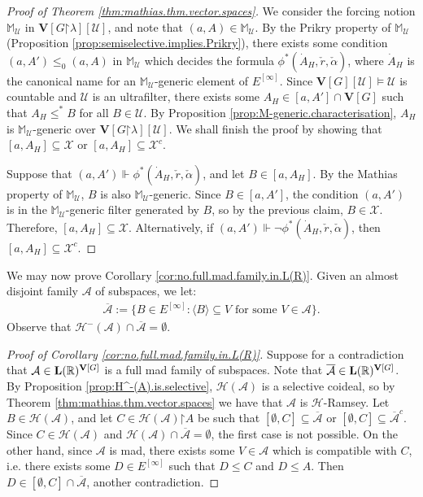 \documentclass[10pt,a4paper]{amsart}
\theoremstyle{plain}
\numberwithin{equation}{section}
\theoremstyle{definition}
\renewcommand{\c}[1]{\langle #1 \rangle}
\newcommand{\R}{\mathbb{R}}
\renewcommand{\bar}[1]{\overline{#1}}
\newcommand{\cal}{\mathcal}
\renewcommand{\bf}{\mathbf}
\newcommand{\A}{\cal{A}}
\newcommand{\forces}{\Vdash}
\newcommand{\restrictedto}{\mathord{\upharpoonright}}
\newcommand{\U}{\cal{U}}
\newcommand{\V}{\bf{V}}
\newcommand{\X}{\cal{X}}
\renewcommand{\H}{\cal{H}}
\let\strokeL\L
\DeclareRobustCommand{\L}{\ifmmode\mathbf{L}\else\strokeL\fi}
\begin{document}
\begin{proof}[Proof of Theorem \ref{thm:mathias.thm.vector.spaces}]
    We consider the forcing notion $\mathbb{M}_\U$ in $\V[G\restrictedto\lambda][\U]$, and note that $(a,A) \in \mathbb{M}_\U$. By the Prikry property of $\mathbb{M}_\U$ (Proposition \ref{prop:semiselective.implies.Prikry}), there exists some condition $(a,A') \leq_0 (a,A)$ in $\mathbb{M}_\U$ which decides the formula $\phi^*(\dot{A}_H,\check{r},\check{\alpha})$, where $\dot{A}_H$ is the canonical name for an $\mathbb{M}_\U$-generic element of $E^{[\infty]}$. Since $\V[G][\U] \models \U$ is countable and $\U$ is an ultrafilter, there exists some $A_H \in [a,A'] \cap \V[G]$ such that $A_H \leq^* B$ for all $B \in \U$. By Proposition \ref{prop:M-generic.characterisation}, $A_H$ is $\mathbb{M}_\U$-generic over $\V[G\restrictedto\lambda][\U]$. We shall finish the proof by showing that $[a,A_H] \subseteq \X$ or $[a,A_H] \subseteq \X^c$.

    Suppose that $(a,A') \forces \phi^*(\dot{A}_H,\check{r},\check{\alpha})$, and let $B \in [a,A_H]$. By the Mathias property of $\mathbb{M}_\U$, $B$ is also $\mathbb{M}_\U$-generic. Since $B \in [a,A']$, the condition $(a,A')$ is in the $\mathbb{M}_\U$-generic filter generated by $B$, so by the previous claim, $B \in \X$. Therefore, $[a,A_H] \subseteq \X$. Alternatively, if $(a,A') \forces \neg\phi^*(\dot{A}_H,\check{r},\check{\alpha})$, then $[a,A_H] \subseteq \X^c$.
\end{proof}

We may now prove Corollary \ref{cor:no.full.mad.family.in.L(R)}. Given an almost disjoint family $\A$ of subspaces, we let:
\begin{align*}
    \bar{\A} := \{B \in E^{[\infty]} : \c{B} \subseteq V \text{ for some } V \in \A\}.
\end{align*}
Observe that $\H^-(\A) \cap \bar{\A} = \emptyset$.

\begin{proof}[Proof of Corollary \ref{cor:no.full.mad.family.in.L(R)}]
    Suppose for a contradiction that $\A \in \L(\R)^{\V[G]}$ is a full mad family of subspaces. Note that $\bar{\A} \in \L(\R)^{\V[G]}$. By Proposition \ref{prop:H^-(A).is.selective}, $\H(\A)$ is a selective coideal, so by Theorem \ref{thm:mathias.thm.vector.spaces} we have that $\A$ is $\H$-Ramsey. Let $B \in \H(\A)$, and let $C \in \H(\A)\restrictedto A$ be such that $[\emptyset,C] \subseteq \bar{\A}$ or $[\emptyset,C] \subseteq \bar{\A}^c$. Since $C \in \H(\A)$ and $\H(\A) \cap \bar{\A} = \emptyset$, the first case is not possible. On the other hand, since $\A$ is mad, there exists some $V \in \A$ which is compatible with $C$, i.e. there exists some $D \in E^{[\infty]}$ such that $D \leq C$ and $D \leq A$. Then $D \in [\emptyset,C] \cap \bar{\A}$, another contradiction.
\end{proof}
\end{document}
